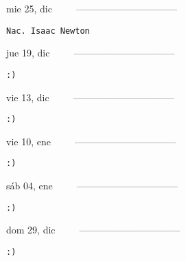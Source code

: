 \documentclass[letterpaper,10pt]{article}
\begin{document}
\begin{multicols}{3}
{mie 25, dic\ \ \ \ \ --------------------------------}
\begin{flushright}\begin{small}\texttt{Nac. Isaac Newton}\end{small}\end{flushright}
\vfill
{jue 19, dic\ \ \ \ \ --------------------------------}
\begin{flushright}\begin{small}\texttt{:)}\end{small}\end{flushright}\par
\vfill
{vie 13, dic\ \ \ \ \ --------------------------------}
\begin{flushright}\begin{small}\texttt{:)}\end{small}\end{flushright}\par
\vfill
\end{multicols}
\vspace{1.05cm}

\begin{multicols}{3}
{vie 10, ene\ \ \ \ \ --------------------------------}
\begin{flushright}\begin{small}\texttt{:)}\end{small}\end{flushright}
\vfill
{sáb 04, ene\ \ \ \ \ --------------------------------}
\begin{flushright}\begin{small}\texttt{:)}\end{small}\end{flushright}\par
\vfill
{dom 29, dic\ \ \ \ \ --------------------------------}
\begin{flushright}\begin{small}\texttt{:)}\end{small}\end{flushright}\par
\vfill
\end{multicols}
\vspace{1.05cm}
\end{document}
